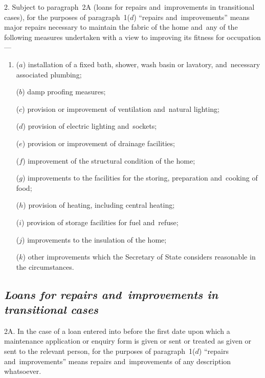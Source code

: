 \documentclass[12pt,a4paper]{article}
\begin{document}
2.  %
Subject to paragraph~2A (loans for repairs and~improvements in transitional cases), for the purposes of  %
paragraph~1($d$) “repairs and~improvements” means major repairs necessary to maintain the fabric of the home and~any of the following measures undertaken with a view to improving its fitness for occupation—
\begin{enumerate}\item[]
($a$) installation of a fixed bath, shower, wash basin or lavatory, and~necessary associated plumbing;

($b$) damp proofing measures;

($c$) provision or improvement of ventilation and~natural lighting;

($d$) provision of electric lighting and~sockets;

($e$) provision or improvement of drainage facilities;

($f$) improvement of the structural condition of the home;

($g$) improvements to the facilities for the storing, preparation and~cooking of food;

($h$) provision of heating, including central heating;

($i$) provision of storage facilities for fuel and~refuse;

($j$) improvements to the insulation of the home;

($k$) other improvements which the 
Secretary of State  %
considers reasonable in the circumstances.
\end{enumerate}


\subsection*{\itshape Loans for repairs and~improvements in transitional cases}

2A.  In the case of a loan entered into before the first date upon which a maintenance application or enquiry form is given or sent or treated as given or sent to the relevant person, for the purposes of paragraph~1($d$) “repairs and~improvements” means repairs and~improvements of any description whatsoever.
\end{document}
